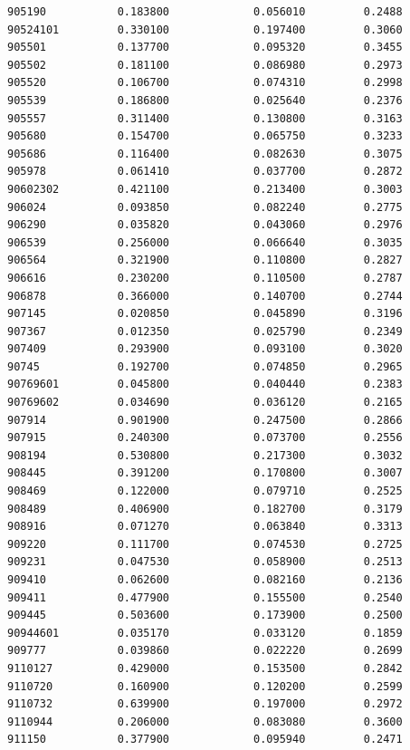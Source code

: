 \documentclass[
  letterpaper,
  DIV=11,
  numbers=noendperiod]{scrartcl}
\begin{document}
\begin{verbatim}
905190           0.183800             0.056010         0.2488
90524101         0.330100             0.197400         0.3060
905501           0.137700             0.095320         0.3455
905502           0.181100             0.086980         0.2973
905520           0.106700             0.074310         0.2998
905539           0.186800             0.025640         0.2376
905557           0.311400             0.130800         0.3163
905680           0.154700             0.065750         0.3233
905686           0.116400             0.082630         0.3075
905978           0.061410             0.037700         0.2872
90602302         0.421100             0.213400         0.3003
906024           0.093850             0.082240         0.2775
906290           0.035820             0.043060         0.2976
906539           0.256000             0.066640         0.3035
906564           0.321900             0.110800         0.2827
906616           0.230200             0.110500         0.2787
906878           0.366000             0.140700         0.2744
907145           0.020850             0.045890         0.3196
907367           0.012350             0.025790         0.2349
907409           0.293900             0.093100         0.3020
90745            0.192700             0.074850         0.2965
90769601         0.045800             0.040440         0.2383
90769602         0.034690             0.036120         0.2165
907914           0.901900             0.247500         0.2866
907915           0.240300             0.073700         0.2556
908194           0.530800             0.217300         0.3032
908445           0.391200             0.170800         0.3007
908469           0.122000             0.079710         0.2525
908489           0.406900             0.182700         0.3179
908916           0.071270             0.063840         0.3313
909220           0.111700             0.074530         0.2725
909231           0.047530             0.058900         0.2513
909410           0.062600             0.082160         0.2136
909411           0.477900             0.155500         0.2540
909445           0.503600             0.173900         0.2500
90944601         0.035170             0.033120         0.1859
909777           0.039860             0.022220         0.2699
9110127          0.429000             0.153500         0.2842
9110720          0.160900             0.120200         0.2599
9110732          0.639900             0.197000         0.2972
9110944          0.206000             0.083080         0.3600
911150           0.377900             0.095940         0.2471

\end{verbatim}
\end{document}
